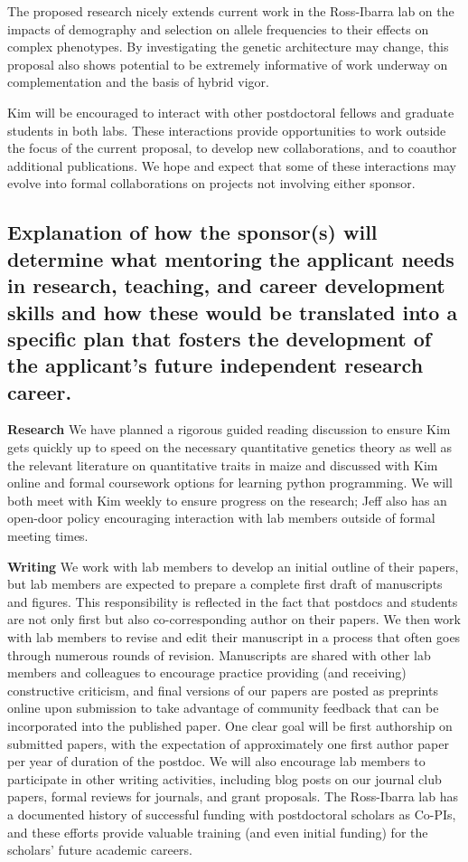 The proposed research nicely extends current work in the Ross-Ibarra lab on the impacts of demography and selection on allele frequencies to their effects on complex phenotypes. By investigating the genetic architecture may change, this proposal also shows potential to be extremely informative of work underway on complementation and the basis of hybrid vigor.  

Kim will be encouraged to interact with other postdoctoral fellows and graduate students in both labs.  These interactions provide opportunities to work outside the focus of the current proposal, to develop new collaborations, and to coauthor additional publications.  We hope and expect that some of these interactions may evolve into formal collaborations on projects not involving either sponsor.  

\subsection{Explanation of how the sponsor(s) will determine what mentoring the applicant needs in research, teaching, and career development skills and how these would be translated into a specific plan that fosters the development of the applicant's future independent research career.}

\textbf{Research} We have planned a rigorous guided reading discussion to ensure Kim gets quickly up to speed on the necessary quantitative genetics theory as well as the relevant literature on quantitative traits in maize and discussed with Kim online and formal coursework options for learning python programming. We will both meet with Kim weekly to ensure progress on the research; Jeff also has an open-door policy encouraging interaction with lab members outside of formal meeting times.

\textbf{Writing} We work with lab members to develop an initial outline of their papers, but lab members are expected to prepare a complete first draft of manuscripts and figures. This responsibility is reflected in the fact that postdocs and students are not only first but also co-corresponding author on their papers. We then work with lab members to revise and edit their manuscript in a process that often goes through numerous rounds of revision. Manuscripts are shared with other lab members and colleagues to encourage practice providing (and receiving) constructive criticism, and final versions of our papers are posted as preprints online upon submission to take advantage of community feedback that can be incorporated into the published paper.  One clear goal will be first authorship on submitted papers, with the expectation of approximately one first author paper per year of duration of the postdoc.  We will also encourage lab members to participate in other writing activities, including blog posts on our journal club papers, formal reviews for journals, and grant proposals.  The Ross-Ibarra lab has a documented history of successful funding with postdoctoral scholars as Co-PIs, and these efforts provide valuable training (and even initial funding) for the scholars' future academic careers.  


